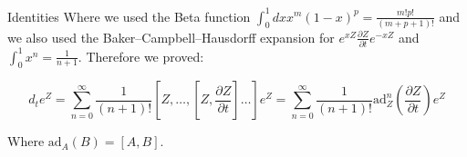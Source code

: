 \begin{subappendices}
\begin{section}{Identities}
Where we used the Beta function $\int_0^1 dx x^m (1-x)^p = \frac{m!p!}{(m+p+1)!}$ and we also used the Baker–Campbell–Hausdorff expansion for $e^{xZ}\frac{\partial Z}{\partial t}e^{-xZ}$ and $\int_0^1 x^n = \frac{1}{n+1}$. Therefore we proved:

\begin{equation}
\label{SneidersID}
d_t e^{Z} = \sum_{n=0}^\infty \frac{1}{(n+1)!} \left[Z, \dots, \left[Z, \frac{\partial Z}{\partial t}\right] \dots \right] e^Z = \sum_{n=0}^\infty \frac{1}{(n+1)!} \text{ad}_Z ^n \left(\frac{\partial Z}{\partial t}\right) e^Z
\end{equation}

Where $\text{ad}_A(B) = [A,B]$.

\end{section}

\end{subappendices}







